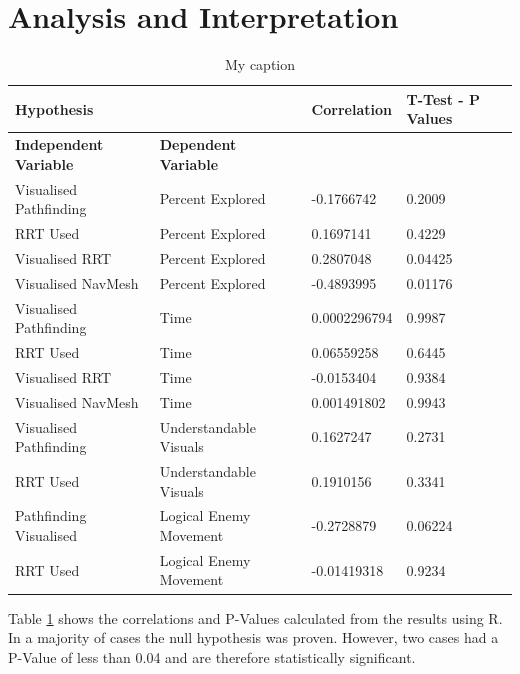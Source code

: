 \documentclass[journal]{IEEEtran}
\begin{document}
	\section{Analysis and Interpretation}
	\begin{table}[]
		\centering
		\caption{My caption}
		\label{StatsTable}
		\def\arraystretch{1.5}
		\begin{tabular}{|l|l|l|l|}
			\hline
			\textbf{Hypothesis} & & \textbf{Correlation} & \textbf{T-Test - P Values} \\ \hline 
			\textbf{Independent Variable }    &  \textbf{Dependent Variable }    &        &                   \\ \hline
			Visualised Pathfinding & Percent Explored   & -0.1766742   & 0.2009            \\ \hline
			RRT Used                & Percent Explored     & 0.1697141    & 0.4229            \\ \hline
			Visualised RRT           & Percent Explored   & 0.2807048    & 0.04425           \\ \hline
			Visualised NavMesh     & Percent Explored   & -0.4893995   & 0.01176           \\ \hline
			Visualised Pathfinding & Time        & 0.0002296794 & 0.9987            \\ \hline
			RRT Used               & Time       & 0.06559258    & 0.6445            \\ \hline
			Visualised RRT            & Time       & -0.0153404    & 0.9384            \\ \hline
			Visualised NavMesh       & Time       & 0.001491802   & 0.9943            \\ \hline
			Visualised Pathfinding & Understandable Visuals & 0.1627247    & 0.2731            \\ \hline
			RRT Used                & Understandable Visuals & 0.1910156    & 0.3341            \\ \hline
			Pathfinding Visualised & Logical Enemy Movement & -0.2728879   & 0.06224           \\ \hline
			RRT Used               & Logical Enemy Movement & -0.01419318  & 0.9234            \\ \hline
		\end{tabular}
	\end{table}
	
	
	Table \ref{StatsTable} shows the correlations and P-Values calculated from the results using R. In a majority of cases the null hypothesis was proven. However, two cases had a P-Value of less than 0.04 and are therefore statistically significant. 
	
\end{document}
